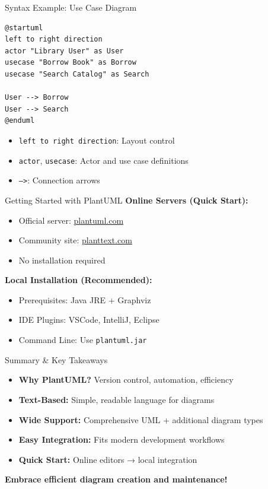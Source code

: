 \documentclass{beamer}
\begin{document}
\begin{frame}[fragile]{Syntax Example: Use Case Diagram}
    \begin{lstlisting}[style=plantuml]
@startuml
left to right direction
actor "Library User" as User
usecase "Borrow Book" as Borrow
usecase "Search Catalog" as Search

User --> Borrow
User --> Search
@enduml
    \end{lstlisting}
    
    \small
    \begin{itemize}
        \item \texttt{left to right direction}: Layout control
        \item \texttt{actor}, \texttt{usecase}: Actor and use case definitions
        \item \texttt{-->}: Connection arrows
    \end{itemize}
\end{frame}

\begin{frame}{Getting Started with PlantUML}
    \textbf{Online Servers (Quick Start):}
    \begin{itemize}
        \item Official server: \href{http://plantuml.com}{plantuml.com}
        \item Community site: \href{http://planttext.com}{planttext.com}
        \item No installation required
    \end{itemize}
    
    \vspace{0.5cm}
    \textbf{Local Installation (Recommended):}
    \begin{itemize}
        \item Prerequisites: Java JRE + Graphviz
        \item IDE Plugins: VSCode, IntelliJ, Eclipse
        \item Command Line: Use \texttt{plantuml.jar}
    \end{itemize}
\end{frame}

\begin{frame}{Summary \& Key Takeaways}
    \begin{itemize}
        \item \textbf{Why PlantUML?} Version control, automation, efficiency
        \item \textbf{Text-Based:} Simple, readable language for diagrams
        \item \textbf{Wide Support:} Comprehensive UML + additional diagram types
        \item \textbf{Easy Integration:} Fits modern development workflows
        \item \textbf{Quick Start:} Online editors → local integration
    \end{itemize}
    
    \vspace{0.5cm}
    \textbf{Embrace efficient diagram creation and maintenance!}
\end{frame}
\end{document}
